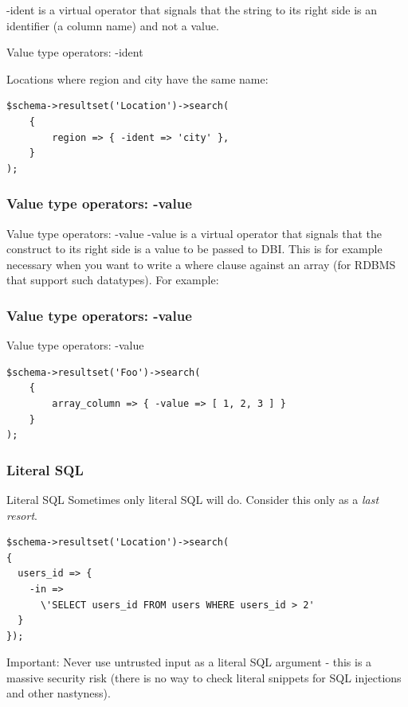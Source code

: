 -ident is a virtual operator that signals that the string to its right side
is an identifier (a column name) and not a value.

\begin{frame}[fragile]{Value type operators: -ident}

Locations where region and city have the same name:

\begin{lstlisting}
$schema->resultset('Location')->search(
    {
        region => { -ident => 'city' },
    }
);
\end{lstlisting}
\end{frame}

\subsubsection{Value type operators: -value}

Value type operators: -value
-value is a virtual operator that signals that the construct to its right
side is a value to be passed to DBI. This is for example necessary when you
want to write a where clause against an array (for RDBMS that support such
datatypes). For example:

\subsubsection{Value type operators: -value}
\begin{frame}[fragile]{Value type operators: -value}
\begin{lstlisting}
$schema->resultset('Foo')->search(
    {
        array_column => { -value => [ 1, 2, 3 ] }
    }
);
\end{lstlisting}
\end{frame}

\subsubsection{Literal SQL}
\begin{frame}[fragile]{Literal SQL}
Sometimes only literal SQL will do. 
Consider this only as a \emph{last resort}.

\begin{lstlisting}
$schema->resultset('Location')->search(
{
  users_id => {
    -in =>
      \'SELECT users_id FROM users WHERE users_id > 2'
  }
});
\end{lstlisting}
\end{frame}

Important: Never use untrusted input as a literal SQL argument - this is a
massive security risk (there is no way to check literal snippets for SQL
injections and other nastyness).

